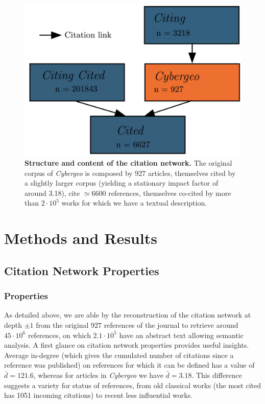 \documentclass[10pt]{article}
\begin{document}
\begin{figure}
\centering
\includegraphics[width=\linewidth]{Fig2.jpg}
\caption{\textbf{Structure and content of the citation network.} The original corpus of \emph{Cybergeo} is composed by 927 articles, themselves cited by a slightly larger corpus (yielding a stationary impact factor of around 3.18), cite $\simeq 6600$ references, themselves co-cited by more than $2\cdot 10^5$ works for which we have a textual description.}
\label{fig:citationnetwork}
\end{figure}









\section*{Methods and Results}
\label{sec:results}



\subsection*{Citation Network Properties}

\subsubsection*{Properties}


As detailed above, we are able by the reconstruction of the citation network at depth $\pm 1$ from the original $927$ references of the journal to retrieve around $45\cdot 10^6$ references, on which $2.1\cdot 10^5$ have an abstract text allowing semantic analysis. A first glance on citation network properties provides useful insights. Average in-degree (which gives the cumulated number of citations since a reference was published) on references for which it can be defined has a value of $\bar{d}=121.6$, whereas for articles in \textit{Cybergeo} we have $\bar{d}=3.18$. This difference suggests a variety for status of references, from old classical works (the most cited has 1051 incoming citations) to recent less influential works.
\end{document}
